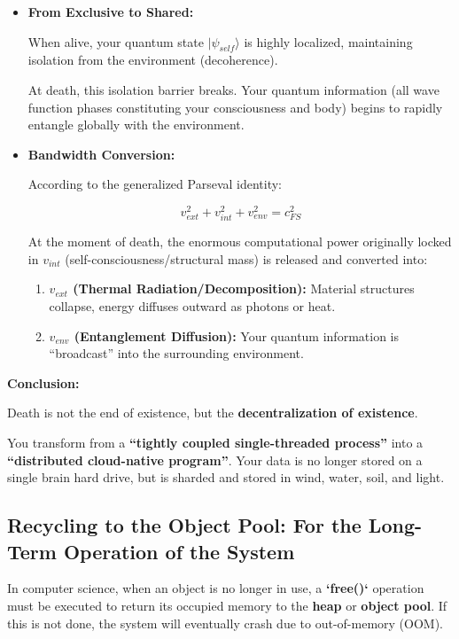 \documentclass[11pt,a4paper,twoside]{book}
\begin{document}
\begin{itemize}
\item \textbf{From Exclusive to Shared:}

    When alive, your quantum state \textbf{$|\psi_{self}\rangle$} is highly localized, maintaining isolation from the environment (decoherence).

    At death, this isolation barrier breaks. Your quantum information (all wave function phases constituting your consciousness and body) begins to rapidly entangle globally with the environment.

\item \textbf{Bandwidth Conversion:}

    According to the generalized Parseval identity:

    $$v_{ext}^2 + v_{int}^2 + v_{env}^2 = c_{FS}^2$$

    At the moment of death, the enormous computational power originally locked in \textbf{$v_{int}$} (self-consciousness/structural mass) is released and converted into:

    \begin{enumerate}
    \item \textbf{$v_{ext}$ (Thermal Radiation/Decomposition):} Material structures collapse, energy diffuses outward as photons or heat.

    \item \textbf{$v_{env}$ (Entanglement Diffusion):} Your quantum information is ``broadcast'' into the surrounding environment.
    \end{enumerate}
\end{itemize}

\textbf{Conclusion:}

Death is not the end of existence, but the \textbf{decentralization of existence}.

You transform from a \textbf{``tightly coupled single-threaded process''} into a \textbf{``distributed cloud-native program''}. Your data is no longer stored on a single brain hard drive, but is sharded and stored in wind, water, soil, and light.

\subsection{Recycling to the Object Pool: For the Long-Term Operation of the System}

In computer science, when an object is no longer in use, a \textbf{`free()`} operation must be executed to return its occupied memory to the \textbf{heap} or \textbf{object pool}. If this is not done, the system will eventually crash due to out-of-memory (OOM).
\end{document}
